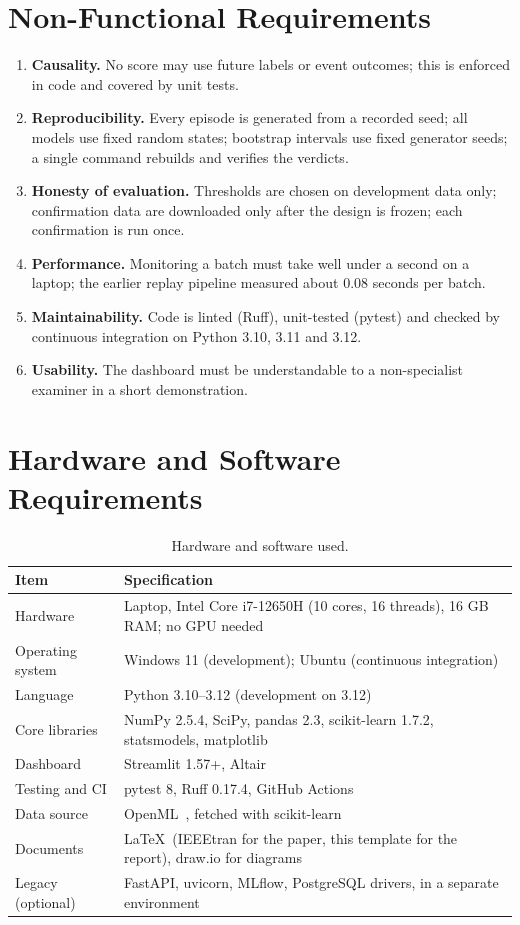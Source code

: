 \section{Non-Functional Requirements}
\begin{enumerate}[label=NFR\arabic*.]
\item \textbf{Causality.} No score may use future labels or event outcomes; this is enforced in code and covered by unit tests.
\item \textbf{Reproducibility.} Every episode is generated from a recorded seed; all models use fixed random states; bootstrap intervals use fixed generator seeds; a single command rebuilds and verifies the verdicts.
\item \textbf{Honesty of evaluation.} Thresholds are chosen on development data only; confirmation data are downloaded only after the design is frozen; each confirmation is run once.
\item \textbf{Performance.} Monitoring a batch must take well under a second on a laptop; the earlier replay pipeline measured about 0.08 seconds per batch.
\item \textbf{Maintainability.} Code is linted (Ruff), unit-tested (pytest) and checked by continuous integration on Python 3.10, 3.11 and 3.12.
\item \textbf{Usability.} The dashboard must be understandable to a non-specialist examiner in a short demonstration.
\end{enumerate}

\section{Hardware and Software Requirements}
\begin{table}[H]
\caption{Hardware and software used.}
\label{tab:env}
\centering
\small
\begin{tabularx}{\textwidth}{@{}p{3.5cm}X@{}}
\toprule
Item & Specification \\
\midrule
Hardware & Laptop, Intel Core i7-12650H (10 cores, 16 threads), 16 GB RAM; no GPU needed \\
Operating system & Windows 11 (development); Ubuntu (continuous integration) \\
Language & Python 3.10--3.12 (development on 3.12) \\
Core libraries & NumPy 2.5.4, SciPy, pandas 2.3, scikit-learn 1.7.2, statsmodels, matplotlib \\
Dashboard & Streamlit 1.57+, Altair \\
Testing and CI & pytest 8, Ruff 0.17.4, GitHub Actions \\
Data source & OpenML~\cite{vanschoren2014openml}, fetched with scikit-learn \\
Documents & \LaTeX\ (IEEEtran for the paper, this template for the report), draw.io for diagrams \\
Legacy (optional) & FastAPI, uvicorn, MLflow, PostgreSQL drivers, in a separate environment \\
\bottomrule
\end{tabularx}
\end{table}


